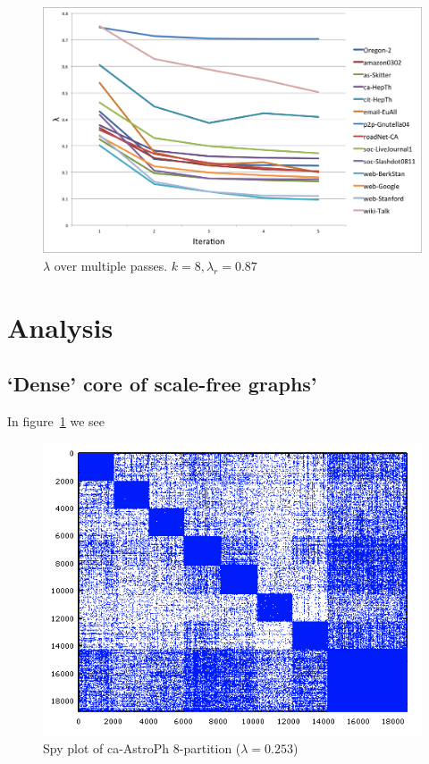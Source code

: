 \documentclass[11pt]{article}
\begin{document}
\begin{figure}[h]
\centering
\includegraphics[scale=0.55] {figures/line_plot_lambda}
\caption[Caption for]{$\lambda$ over multiple passes. $k=8, \lambda_r = 0.87$}
\end{figure}

\section{Analysis}
\subsection{`Dense' core of scale-free graphs'}
In figure~\ref{fig:dense} we see 
\begin{figure}[h!]
\centering
  \includegraphics[width=.7\textwidth]{figures/astroPh8.png}
  \caption{Spy plot of ca-AstroPh 8-partition ($\lambda=0.253$)}
  \label{fig:dense}
\end{figure}




\end{document}

